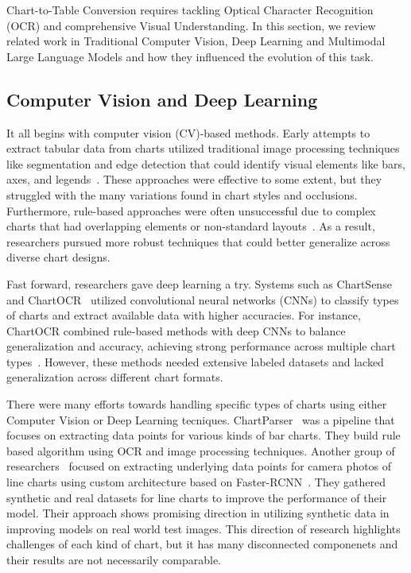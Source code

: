 \documentclass[
	letterpaper, %
]{jdf}
\begin{document}
Chart-to-Table Conversion requires tackling Optical Character Recognition (OCR) and comprehensive Visual Understanding.
In this section, we review related work in Traditional Computer Vision, Deep Learning and Multimodal Large Language Models and how they influenced the evolution of this task.

\subsection{Computer Vision and Deep Learning}\label{ssect:cv-and-dl}
    It all begins with computer vision (CV)-based methods.
    Early attempts to extract tabular data from charts utilized traditional image processing techniques like segmentation and edge detection that could identify visual elements like bars, axes, and legends~\cite{sreevalsan2021tensor}.
    These approaches were effective to some extent, but they struggled with the many variations found in chart styles and occlusions.
    Furthermore, rule-based approaches were often unsuccessful due to complex charts that had overlapping elements or non-standard layouts~\cite{poco2017reverse}.
    As a result, researchers pursued more robust techniques that could better generalize across diverse chart designs.

    Fast forward, researchers gave deep learning a try.
    Systems such as ChartSense~\cite{jung2017chartsense} and ChartOCR~\cite{luo2021chartocr} utilized convolutional neural networks (CNNs) to classify types of charts and extract available data with higher accuracies.
    For instance, ChartOCR combined rule-based methods with deep CNNs to balance generalization and accuracy, achieving strong performance across multiple chart types~\cite{luo2021chartocr}.
    However, these methods needed extensive labeled datasets and lacked generalization across different chart formats.

    There were many efforts towards handling specific types of charts using either Computer Vision or Deep Learning tecniques.
    ChartParser~\cite{kumar2022chartparser} was a pipeline that focuses on extracting data points for various kinds of bar charts.
    They build rule based algorithm using OCR and image processing techniques.
    Another group of researchers~\cite{li2022chart} focused on extracting underlying data points for camera photos of line charts using custom architecture based on Faster-RCNN~\cite{ren2015faster}.
    They gathered synthetic and real datasets for line charts to improve the performance of their model.
    Their approach shows promising direction in utilizing synthetic data in improving models on real world test images.
    This direction of research highlights challenges of each kind of chart, but it has many disconnected componenets and their results are not necessarily comparable.
\end{document}
